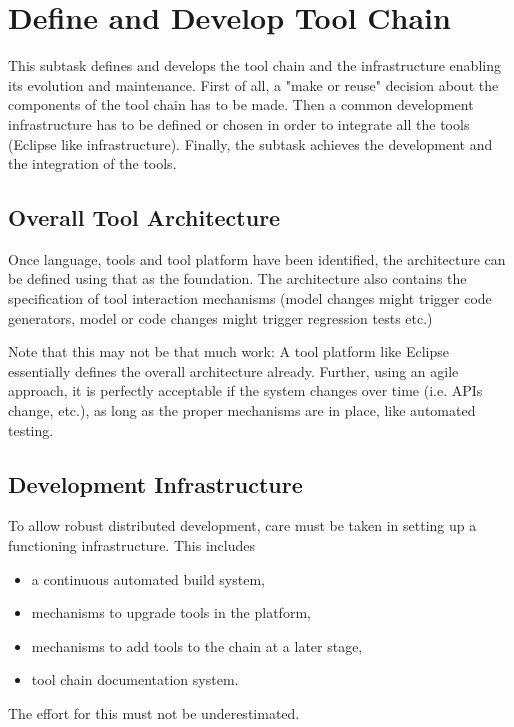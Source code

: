 \documentclass{template/openetcs_article}
\begin{document}
\section{Define and Develop Tool Chain}\label{sec:devtoolchain}


This subtask defines and develops the tool chain and the infrastructure enabling its evolution and maintenance. First of all, a "make or reuse" decision about the components of the tool chain has to be made. Then a common development infrastructure has to be defined or chosen in order to integrate all the tools (Eclipse like infrastructure). Finally, the subtask achieves the development and the integration of the tools.

\subsection{Overall Tool Architecture}

Once language, tools and tool platform have been identified, the architecture can be defined using that as the foundation.  The architecture also contains the specification of tool interaction mechanisms (model changes might trigger code generators, model or code changes might trigger regression tests etc.) 

Note that this may not be that much work:  A tool platform like Eclipse essentially defines the overall architecture already.  Further, using an agile approach, it is perfectly acceptable if the system changes over time (i.e. APIs change, etc.), as long as the proper mechanisms are in place, like automated testing.

\subsection{Development Infrastructure}

To allow robust distributed development, care must be taken in setting up a functioning infrastructure.  This includes 
\begin{itemize}
\item a continuous automated build system, 
\item mechanisms to upgrade tools in the platform, 
\item mechanisms to add tools to the chain at a later stage,
\item tool chain documentation system. 
\end{itemize}
 The effort for this must not be underestimated.
\end{document}
